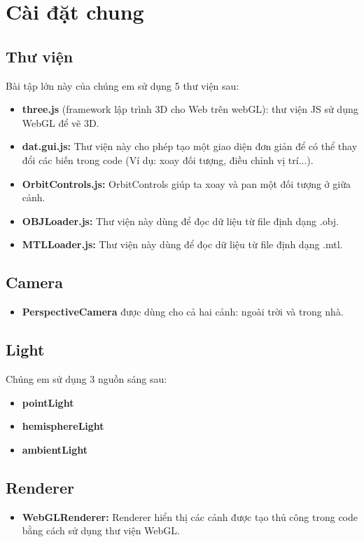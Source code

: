 \section{Cài đặt chung}

\subsection{Thư viện}
Bài tập lớn này của chúng em sử dụng 5 thư viện sau:
\begin{itemize}
\item \textbf{three.js} (framework lập trình 3D cho Web trên webGL): thư viện JS sử dụng WebGL để vẽ 3D.
\item \textbf{dat.gui.js:} Thư viện này cho phép tạo một giao diện đơn giản để có thể thay đổi các biến trong code (Ví dụ: xoay đối tượng, điều chỉnh vị trí...).
\item \textbf{OrbitControls.js:} OrbitControls giúp ta xoay và pan một đối tượng ở giữa cảnh.
\item \textbf{OBJLoader.js:} Thư viện này dùng để đọc dữ liệu từ file định dạng .obj.
\item \textbf{MTLLoader.js:} Thư viện này dùng để đọc dữ liệu từ file định dạng .mtl.
\end{itemize}

\subsection{Camera}
\begin{itemize}
    \item \textbf{PerspectiveCamera} được dùng cho cả hai cảnh: ngoài trời và trong nhà.
\end{itemize}

\subsection{Light}
Chúng em sử dụng 3 nguồn sáng sau: 
\begin{itemize}
    \item \textbf{pointLight}
    \item \textbf{hemisphereLight}
    \item \textbf{ambientLight}
\end{itemize}

\subsection{Renderer}
\begin{itemize}
    \item \textbf{WebGLRenderer:} Renderer hiển thị các cảnh được tạo thủ công trong code bằng cách sử dụng thư viện WebGL. 
\end{itemize}